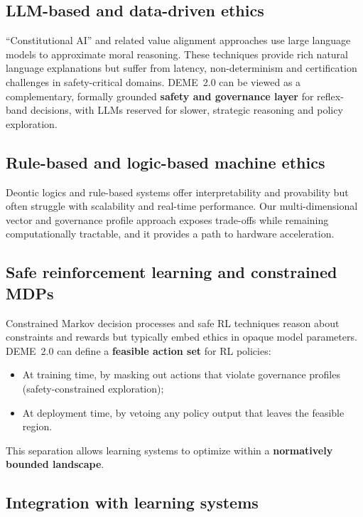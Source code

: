 \documentclass[11pt]{article}
\begin{document}
\subsection{LLM-based and data-driven ethics}

``Constitutional AI'' and related value alignment approaches use large language models to approximate moral reasoning. These techniques provide rich natural language explanations but suffer from latency, non-determinism and certification challenges in safety-critical domains. DEME~2.0 can be viewed as a complementary, formally grounded \textbf{safety and governance layer} for reflex-band decisions, with LLMs reserved for slower, strategic reasoning and policy exploration.

\subsection{Rule-based and logic-based machine ethics}

Deontic logics and rule-based systems offer interpretability and provability but often struggle with scalability and real-time performance. Our multi-dimensional vector and governance profile approach exposes trade-offs while remaining computationally tractable, and it provides a path to hardware acceleration.

\subsection{Safe reinforcement learning and constrained MDPs}

Constrained Markov decision processes and safe RL techniques reason about constraints and rewards but typically embed ethics in opaque model parameters. DEME~2.0 can define a \textbf{feasible action set} for RL policies:

\begin{itemize}
  \item At training time, by masking out actions that violate governance profiles (safety-constrained exploration);
  \item At deployment time, by vetoing any policy output that leaves the feasible region.
\end{itemize}

This separation allows learning systems to optimize within a \textbf{normatively bounded landscape}.

\subsection{Integration with learning systems}
\end{document}
